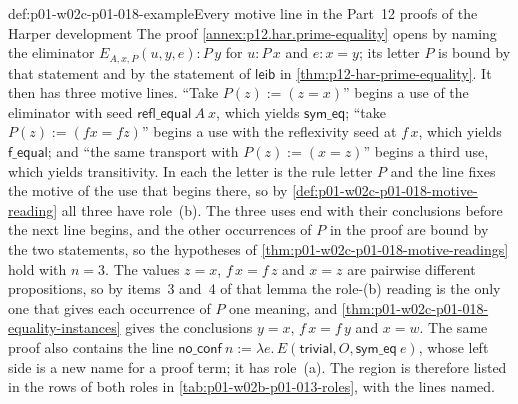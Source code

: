 \begin{hbexample}{def:p01-w02c-p01-018-example}{Every motive line in the Part~12 proofs of the Harper development}
The proof \cref{annex:p12.har.prime-equality} opens by naming the
eliminator \(E_{A,x,P}(u,y,e):P\,y\) for \(u:P\,x\) and \(e:x=y\); its
letter \(P\) is bound by that statement and by the statement of
\(\mathsf{leib}\) in \cref{thm:p12-har-prime-equality}.  It then has three
motive lines.  ``Take \(P(z):=(z=x)\)'' begins a use of the eliminator
with seed \(\mathsf{refl\_equal}\ A\ x\), which yields
\(\mathsf{sym\_eq}\); ``take \(P(z):=(f x=f z)\)'' begins a use with the
reflexivity seed at \(f\,x\), which yields \(\mathsf{f\_equal}\); and
``the same transport with \(P(z):=(x=z)\)'' begins a third use, which
yields transitivity.  In each the letter is the rule letter \(P\) and the
line fixes the motive of the use that begins there, so by
\cref{def:p01-w02c-p01-018-motive-reading} all three have role~(b).  The
three uses end with their conclusions before the next line begins, and
the other occurrences of \(P\) in the proof are bound by the two
statements, so the hypotheses of
\cref{thm:p01-w02c-p01-018-motive-readings} hold with \(n=3\).  The values
\(z=x\), \(f\,x=f\,z\) and \(x=z\) are pairwise different propositions, so
by items~3 and~4 of that lemma the role-(b) reading is the only one that
gives each occurrence of \(P\) one meaning, and
\cref{thm:p01-w02c-p01-018-equality-instances} gives the conclusions
\(y=x\), \(f\,x=f\,y\) and \(x=w\).  The same proof also contains the line
\(\mathsf{no\_conf}\ n:=\lambda e.\,E(\mathsf{trivial},O,
\mathsf{sym\_eq}\ e)\), whose left side is a new name for a proof term;
it has role~(a).  The region is therefore listed in the rows of both
roles in \cref{tab:p01-w02b-p01-013-roles}, with the lines named.


\end{hbexample}
